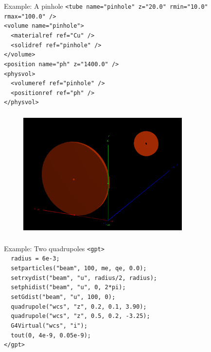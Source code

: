 \documentclass{beamer}
\newcommand{\ident}{\thesection.\thesubsection}
\newcommand{\ftitle}{\frametitle{\nameref{\ident}}}
\begin{document}
\begin{frame}
	\ftitle
	\begin{block}{Example: A pinhole}
		\texttt{<tube name="pinhole" z="20.0" rmin="10.0" rmax="100.0" />\\
			<volume name="pinhole">\\
			~~<materialref ref="Cu" />\\
			~~<solidref ref="pinhole" />\\
			</volume>\\
			<position name="ph" z="1400.0" />\\
			<physvol>\\
			~~<volumeref ref="pinhole" />\\
			~~<positionref ref="ph" />\\
			</physvol>
		}
	\end{block}
\end{frame}

\begin{frame}
	\ftitle
	\begin{figure}
		\includegraphics[width=0.77\textwidth]{img/gdml}
	\end{figure}
\end{frame}

\begin{frame}
	\ftitle
	\begin{block}{Example: Two quadrupoles}
		\texttt{<gpt>\\
			~~radius = 6e-3;\\
			~~setparticles("beam", 100, me, qe, 0.0);\\
			~~setrxydist("beam", "u", radius/2, radius);\\
			~~setphidist("beam", "u", 0, 2*pi);\\
			~~setGdist("beam", "u", 100, 0);\\
			~~quadrupole("wcs", "z", 0.2, 0.1,  3.90);\\
			~~quadrupole("wcs", "z", 0.5, 0.2, -3.25);\\
			~~G4Virtual("wcs", "i");\\
			~~tout(0, 4e-9, 0.05e-9);\\
			</gpt>
		}
	\end{block}
\end{frame}
\end{document}
